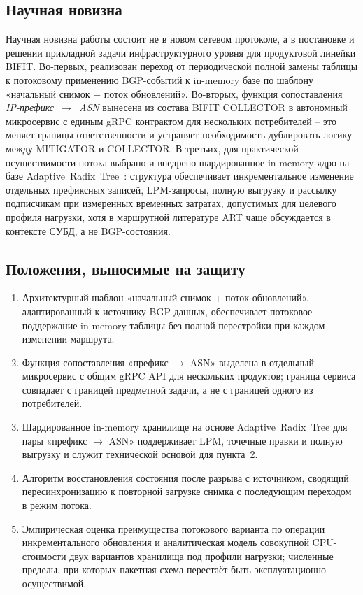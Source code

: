 \subsection*{Научная новизна}

Научная новизна работы состоит не в новом сетевом протоколе, а в
постановке и решении прикладной задачи инфраструктурного уровня для
продуктовой линейки BIFIT. Во-первых, реализован переход от периодической
полной замены таблицы к потоковому применению BGP-событий к in-memory
базе по шаблону «начальный снимок + поток обновлений». Во-вторых, функция
сопоставления \textit{IP-префикс~$\rightarrow$~ASN} вынесена из состава
BIFIT COLLECTOR в автономный микросервис с единым gRPC контрактом для
нескольких потребителей -- это меняет границы ответственности и устраняет
необходимость дублировать логику между MITIGATOR и COLLECTOR. В-третьих,
для практической осуществимости потока выбрано и внедрено шардированное
in-memory ядро на базе Adaptive~Radix~Tree~\cite{leis2013art}: структура
обеспечивает инкрементальное изменение отдельных префиксных записей,
LPM-запросы, полную выгрузку и рассылку подписчикам при измеренных
временных затратах, допустимых для целевого профиля нагрузки, хотя в
маршрутной литературе ART чаще обсуждается в контексте СУБД, а не
BGP-состояния.

\subsection*{Положения, выносимые на защиту}

\begin{enumerate}
\item Архитектурный шаблон «начальный снимок + поток обновлений»,
адаптированный к источнику BGP-данных, обеспечивает потоковое
поддержание in-memory таблицы без полной перестройки при каждом
изменении маршрута.
\item Функция сопоставления «префикс $\rightarrow$ ASN» выделена в
отдельный микросервис с общим gRPC API для нескольких продуктов;
граница сервиса совпадает с границей предметной задачи, а не с границей
одного из потребителей.
\item Шардированное in-memory хранилище на основе Adaptive~Radix~Tree
для пары «префикс $\rightarrow$ ASN» поддерживает LPM, точечные правки и
полную выгрузку и служит технической основой для пункта~2.
\item Алгоритм восстановления состояния после разрыва с источником,
сводящий пересинхронизацию к повторной загрузке снимка с последующим
переходом в режим потока.
\item Эмпирическая оценка преимущества потокового варианта по операции
инкрементального обновления и аналитическая модель совокупной
CPU-стоимости двух вариантов хранилища под профили нагрузки; численные
пределы, при которых пакетная схема перестаёт быть эксплуатационно
осуществимой.
\end{enumerate}

